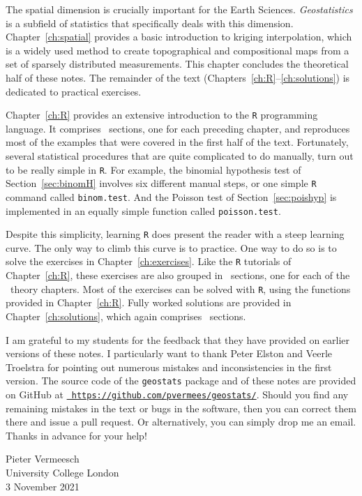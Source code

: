 The spatial dimension is crucially important for the Earth
Sciences. \emph{Geostatistics} is a subfield of statistics that
specifically deals with this dimension. Chapter~\ref{ch:spatial}
provides a basic introduction to kriging interpolation, which is a
widely used method to create topographical and compositional maps from
a set of sparsely distributed measurements. This chapter concludes the
theoretical half of these notes. The remainder of the text
(Chapters~\ref{ch:R}--\ref{ch:solutions}) is dedicated to practical
exercises.\medskip

Chapter~\ref{ch:R} provides an extensive introduction to the
\texttt{R} programming language. It comprises \nch~sections, one for
each preceding chapter, and reproduces most of the examples that were
covered in the first half of the text. Fortunately, several
statistical procedures that are quite complicated to do manually, turn
out to be really simple in \texttt{R}. For example, the binomial
hypothesis test of Section~\ref{sec:binomH} involves six different
manual steps, or one simple \texttt{R} command called
\texttt{binom.test}. And the Poisson test of Section~\ref{sec:poishyp}
is implemented in an equally simple function called
\texttt{poisson.test}.\medskip

Despite this simplicity, learning \texttt{R} does present the reader
with a steep learning curve. The only way to climb this curve is to
practice. One way to do so is to solve the exercises in
Chapter~\ref{ch:exercises}. Like the \texttt{R} tutorials of
Chapter~\ref{ch:R}, these exercises are also grouped in \nch~sections,
one for each of the \nch~theory chapters. Most of the exercises can be
solved with \texttt{R}, using the functions provided in
Chapter~\ref{ch:R}. Fully worked solutions are provided in
Chapter~\ref{ch:solutions}, which again comprises \nch~sections.\medskip

I am grateful to my students for the feedback that they have provided
on earlier versions of these notes.  I particularly want to thank
Peter Elston and Veerle Troelstra for pointing out numerous mistakes
and inconsistencies in the first version. The source code of the
\texttt{geostats} package and of these notes are provided on GitHub at
\href{https://github.com/pvermees/geostats/}{\tt
  https://github.com/pvermees/geostats/}.  Should you find any
remaining mistakes in the text or bugs in the software, then you can
correct them there and issue a pull request. Or alternatively, you can
simply drop me an email. Thanks in advance for your help!\medskip

\begin{flushright}
  Pieter Vermeesch\\ University College London\\ 3 November 2021
\end{flushright}
